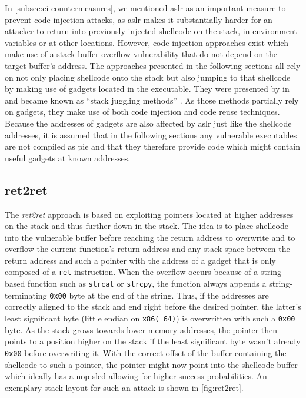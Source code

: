 In \cref{subsec:ci-countermeasures}, we mentioned \gls{aslr} as an important measure to prevent code injection attacks, as \gls{aslr} makes it substantially harder for an attacker to return into previously injected shellcode on the stack, in environment variables or at other locations.
However, code injection approaches exist which make use of a stack buffer overflow vulnerability that do not depend on the target buffer's address.
The approaches presented in the following sections all rely on not only placing shellcode onto the stack but also jumping to that shellcode by making use of gadgets located in the executable.
They were presented by \citeauthor{Kotler2005} in \citeyear{Kotler2005} and became known as ``stack juggling methods'' \cites{Kotler2005}[10]{Mueller2008}.
As those methods partially rely on gadgets, they make use of both code injection and code reuse techniques.
Because the addresses of gadgets are also affected by \gls{aslr} just like the shellcode addresses, it is assumed that in the following sections any vulnerable executables are not compiled as \gls{pie} and that they therefore provide code which might contain useful gadgets at known addresses.

\subsection{ret2ret}
\label{subsec:aici-ret2ret}

The \emph{ret2ret} approach is based on exploiting pointers located at higher addresses on the stack and thus further down in the stack.
The idea is to place shellcode into the vulnerable buffer before reaching the return address to overwrite and to overflow the current function's return address and any stack space between the return address and such a pointer with the address of a gadget that is only composed of a \texttt{ret} instruction.
When the overflow occurs because of a string-based function such as \texttt{strcat} or \texttt{strcpy}, the function always appends a string-terminating \texttt{0x00} byte at the end of the string.
Thus, if the addresses are correctly aligned to the stack and end right before the desired pointer, the latter's least significant byte (little endian on \texttt{x86(\_64)}) is overwritten with such a \texttt{0x00} byte.
As the stack grows towards lower memory addresses, the pointer then points to a position higher on the stack if the least significant byte wasn't already \texttt{0x00} before overwriting it.
With the correct offset of the buffer containing the shellcode to such a pointer, the pointer might now point into the shellcode buffer which ideally has a \acs{nop} sled allowing for higher success probabilities.
An exemplary stack layout for such an attack is shown in \cref{fig:ret2ret}.

